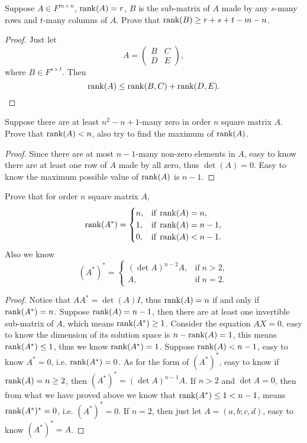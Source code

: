 \begin{pro}%
	Suppose $A\in F^{m\times n}$, $\operatorname*{rank}(A)=r$, $B$ is the sub-matrix of $A$ made by any $s$-many rows and $t$-many columns of $A$. Prove that $\operatorname*{rank}(B)\geq r+s+t-m-n$.
\end{pro}
\begin{proof}
	Just let 
	\[A=\begin{pmatrix} B & C\\ D & E\end{pmatrix},\]
	where $B\in F^{s\times t}$. Then
	\[\operatorname*{rank}(A)\leq \operatorname*{rank}(B,C)+\operatorname*{rank}(D,E).\]
\end{proof}

\begin{pro}%
	Suppose there are at least $n^2-n+1$-many zero in order $n$ square matrix $A$. Prove that $\operatorname*{rank}(A)<n$, also try to find the maximum of $\operatorname*{rank}(A)$.
\end{pro}
\begin{proof}
	Since there are at most $n-1$-many non-zero elements in $A$, easy to know there are at least one row of $A$ made by all zero, thus $\det(A)=0$. Easy to know the maximum possible value of $\operatorname*{rank}(A)$ is $n-1$.
\end{proof}

\begin{pro}%
	Prove that for order $n$ square matrix $A$,
	\[\operatorname*{rank}(A^*)=\begin{cases}
	n, & \mbox{if}\;\operatorname*{rank}(A)=n,\\
	1, & \mbox{if}\;\operatorname*{rank}(A)=n-1,\\
	0, & \mbox{if}\;\operatorname*{rank}(A)<n-1.\end{cases}\]
	Also we know
	\[(A^*)^*=\begin{cases}
	(\det A)^{n-2} A, & \mbox{if}\;n>2,\\
	A, & \mbox{if}\;n=2.\end{cases}\]
\end{pro}
\begin{proof}
	Notice that $A A^*=\det(A)I$, thus $\operatorname*{rank}(A)=n$ if and only if $\operatorname*{rank}(A^*)=n$. Suppose $\operatorname*{rank}(A)=n-1$, then there are at least one invertible sub-matrix of $A$, which means $\operatorname*{rank}(A^*)\geq 1$. Consider the equation $AX=0$, easy to know the dimension of its solution space is $n-\operatorname*{rank}(A)=1$, this means $\operatorname*{rank}(A^*)\leq 1$, thus we know $\operatorname*{rank}(A^*)=1$.
	Suppose $\operatorname*{rank}(A)<n-1$, easy to know $A^*=0$, i.e. $\operatorname*{rank}(A^*)=0$. As for the form of $(A^*)^*$, easy to know if $\operatorname*{rank}(A)=n\geq 2$, then $(A^*)^*=(\det A)^{n-1}A$. If $n>2$ and $\det A=0$, then from what we have proved above we know that $\operatorname*{rank}(A^*)\leq 1<n-1$, means $\operatorname*{rank}(A^*)^*=0$, i.e. $(A^*)^*=0$. If $n=2$, then just let $A=(a,b;c,d)$, easy to know $(A^*)^*=A$.
\end{proof}

